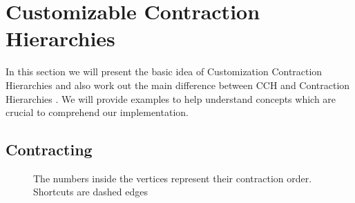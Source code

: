 \chapter{Customizable Contraction Hierarchies}\label{sec:Preliminary_CCH}

In this section we will present the basic idea of Customization Contraction Hierarchies \cite{CCH} and also work out the main difference between CCH and Contraction Hierarchies \cite{Geisberger_2012}.
We will provide examples to help understand concepts which are crucial to comprehend our implementation.

\section{Contracting}



\begin{figure}
    \centering
    
    \caption{The numbers inside the vertices represent their contraction order. Shortcuts are dashed edges}
    \label{fig:contrating_and_searching}
\end{figure}


